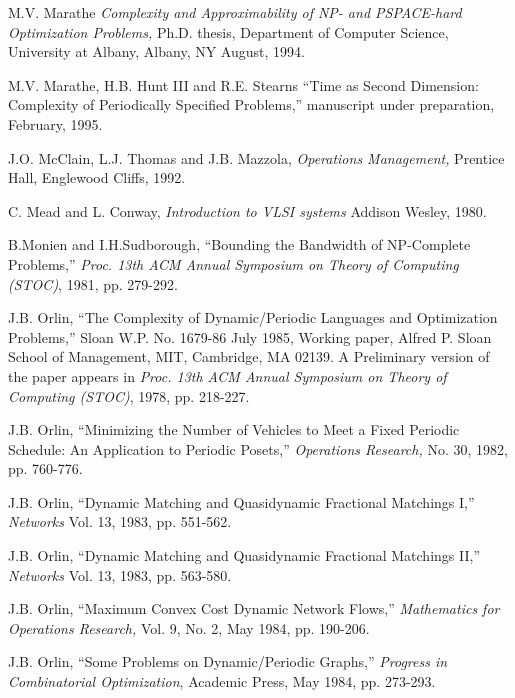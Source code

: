 \begin{thebibliography}{HMRR93}
 M.V. Marathe
{\em Complexity and Approximability of NP- and PSPACE-hard Optimization
Problems,}
Ph.D. thesis, Department of Computer Science, 
University at Albany,  Albany, NY August, 1994.


 M.V. Marathe, H.B. Hunt III and R.E. Stearns 
``Time as  Second Dimension: Complexity of Periodically Specified Problems,''
manuscript under preparation,
February, 1995.





 J.O. McClain, L.J. Thomas and J.B. Mazzola,
{\em Operations Management,}
Prentice Hall, Englewood Cliffs, 1992.

 C. Mead and L. Conway,
{\em Introduction to VLSI systems}
Addison Wesley, 1980.




 B.Monien and I.H.Sudborough, 
``Bounding the Bandwidth of NP-Complete Problems,''
{\em Proc. 13th ACM Annual Symposium on Theory of Computing (STOC)},
1981, pp. 279-292.






 J.B. Orlin,
``The Complexity of Dynamic/Periodic Languages and Optimization Problems,''
Sloan W.P. No. 1679-86 July 1985,
Working paper, Alfred P. Sloan School of Management,
MIT, Cambridge, MA 02139. A Preliminary version of the paper appears in
{\em Proc. 13th ACM Annual Symposium on Theory of Computing (STOC)}, 
1978, pp. 218-227.





 J.B. Orlin,
``Minimizing the Number of Vehicles to Meet a Fixed Periodic Schedule:
An Application to Periodic Posets,''
{\em Operations Research,}
No. 30, 1982, pp. 760-776.




 J.B. Orlin,
``Dynamic Matching and Quasidynamic Fractional Matchings I,''
{\em Networks}
Vol. 13,  1983, pp. 551-562.


 J.B. Orlin,
``Dynamic Matching and Quasidynamic Fractional Matchings II,''
{\em Networks}
Vol. 13,  1983, pp. 563-580.


 J.B. Orlin,
``Maximum Convex Cost  Dynamic Network Flows,''
{\em Mathematics for Operations Research,}
Vol. 9, No. 2, May 1984, pp. 190-206.


 J.B. Orlin,
``Some Problems on Dynamic/Periodic Graphs,''
{\em Progress in Combinatorial Optimization},
Academic Press, May 1984, pp. 273-293.




\end{thebibliography}
